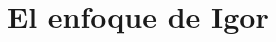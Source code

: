 \documentclass[11pt]{amsart}
\DeclareMathOperator{\pt}{pt}
\theoremstyle{plain}
\newtheorem{prop}[thm]{Proposición}
\theoremstyle{definition}
\newtheorem{dfn}[thm]{Definición}
\begin{document}
\section{El enfoque de Igor}
\cite{Arrieta2024LocalicSeparation}









\end{document}

